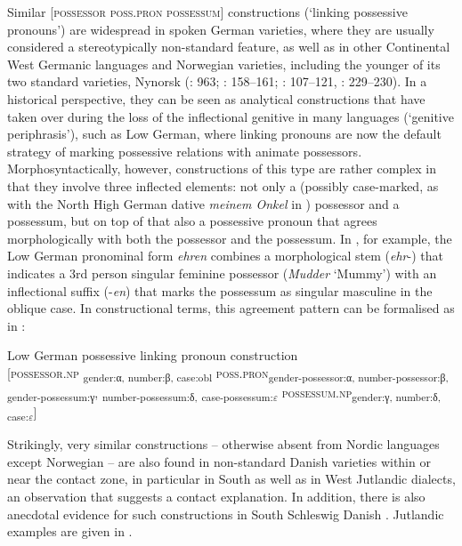 \documentclass[output=paper]{langsci/langscibook}
\begin{document}
Similar {[}\textsc{possessor} \textsc{poss.pron} \textsc{possessum}{]} constructions (‘linking possessive pronouns’) are widespread in spoken German varieties, where they are usually considered a stereotypically non-standard feature, as well as in other Continental West Germanic languages and Norwegian varieties, including the younger of its two standard varieties, Nynorsk (\citealt{KoptjevskajaTamm.2001}: 963; \citealt{Harbert.2007}: 158--161; \citealt{Hoder.2016a}: 107--121, \citealt{Gunleifsen.2011}: 229--230). In a historical perspective, they can be seen as analytical constructions that have taken over during the loss of the inflectional genitive in many languages (‘genitive periphrasis’), such as Low German, where linking pronouns are now the default strategy of marking possessive relations with animate possessors. Morphosyntactically, however, constructions of this type are rather complex in that they involve three inflected elements: not only a (possibly case-marked, as with the North High German dative \textit{meinem Onkel} in ) possessor and a possessum, but on top of that also a possessive pronoun that agrees morphologically with both the possessor and the possessum. In , for example, the Low German pronominal form \textit{ehren} combines a morphological stem (\textit{ehr}-) that indicates a 3rd person singular feminine possessor (\textit{Mudder} ‘Mummy’) with an inflectional suffix (-\textit{en}) that marks the possessum as singular masculine in the oblique case. In constructional terms, this agreement pattern can be formalised as in :

\ea\label{ex:hoeder:16}
	Low German possessive linking pronoun construction\\
     {[}\textsc{possessor.np} \textsubscript{gender:α, number:β, case:obl} \textsc{poss.pron}\textsubscript{gender-possessor:α, number-possessor:β,} \textsubscript{gender-possessum:γ}, \textsubscript{number-possessum:δ,} \textsubscript{case-possessum:$\varepsilon$} \textsc{possessum.np}\textsubscript{gender:γ, number:δ, case:$\varepsilon$}{]}
     \z
     
Strikingly, very similar constructions – otherwise absent from Nordic languages except Norwegian – are also found in non-standard Danish varieties within or near the contact zone, in particular in South as well as in West Jutlandic dialects, an observation that suggests a contact explanation. In addition, there is also anecdotal evidence for such constructions in South Schleswig Danish \citep{Christophersen.1985}. Jutlandic examples are given in .
\end{document}
